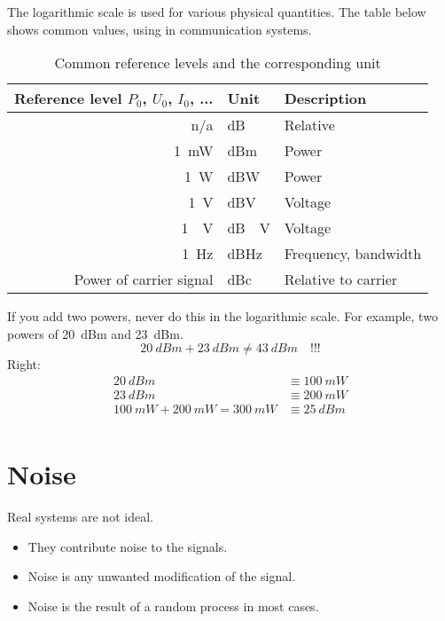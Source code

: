\begin{refsection}
The logarithmic scale is used for various physical quantities. The table below shows common values, using in communication systems.

\begin{table}[H]
	\centering
	\caption{Common reference levels and the corresponding unit}
	\begin{tabular}{|r|l|l|}
		\hline
		Reference level $P_0$, $U_0$, $I_0$, ... & Unit & Description \\
		\hline
		\hline
		n/a & \si{dB} & Relative \\
		\hline
		\SI{1}{mW} & \si{dBm} & Power \\
		\hline
		\SI{1}{W} & \si{dBW} & Power \\
		\hline
		\SI{1}{V} & \si{dBV} & Voltage \\
		\hline
		\SI{1}{\micro.V} & \si{dB\micro.V} & Voltage \\
		\hline
		\SI{1}{Hz} & \si{dBHz} & Frequency, bandwidth \\
		\hline
		Power of carrier signal & \si{dBc} & Relative to carrier \\
		\hline
	\end{tabular}
\end{table}

\begin{attention}
	If you add two powers, never do this in the logarithmic scale. For example, two powers of \SI{20}{dBm} and \SI{23}{dBm}.
	\begin{equation*}
		\SI{20}{dBm} + \SI{23}{dBm} \neq \SI{43}{dBm} \quad \text{!!!}
	\end{equation*}
	Right:
	\begin{equation*}
		\begin{split}
			\SI{20}{dBm} &\equiv \SI{100}{mW} \\
			\SI{23}{dBm} &\equiv \SI{200}{mW} \\
			\SI{100}{mW} + \SI{200}{mW} = \SI{300}{mW} &\equiv \SI{25}{dBm} \\
		\end{split}
	\end{equation*}
\end{attention}

\section{Noise}

Real systems are not ideal.
\begin{itemize}
	\item They contribute noise to the signals.
	\item Noise is any unwanted modification of the signal.
	\item Noise is the result of a random process in most cases.
\end{itemize} 


\end{refsection}
